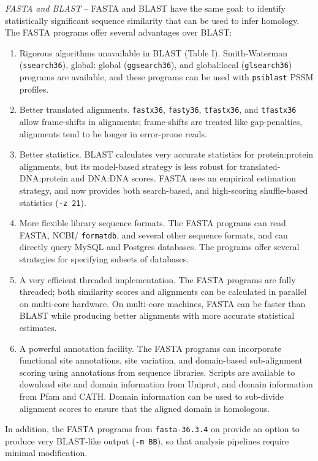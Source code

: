 \documentclass[11pt]{article}
\begin{document}
\emph{FASTA and BLAST} -- FASTA and BLAST have the same goal: to
identify statistically significant sequence similarity that can be
used to infer homology.  The FASTA programs offer several advantages
over BLAST:
\begin{enumerate}
\item
Rigorous algorithms unavailable in BLAST (Table I).  Smith-Waterman
(\texttt{ssearch36}), global: global (\texttt{ggsearch36}), and
global:local (\texttt{glsearch36}) programs are available, and these
programs can be used with \texttt{psiblast} PSSM profiles.
\item
Better translated alignments. \texttt{fastx36}, \texttt{fasty36},
\texttt{tfastx36}, and \texttt{tfastx36} allow frame-shifts in
alignments; frame-shifts are treated like gap-penalties, alignments
tend to be longer in error-prone reads.
\item
Better statistics. BLAST calculates very accurate statistics for
protein:protein alignments, but its model-based strategy is less
robust for translated-DNA:protein and DNA:DNA scores.  FASTA uses an
empirical estimation strategy, and now provides both search-based, and
high-scoring shuffle-based statistics (\texttt{-z 21}).
\item
More flexible library sequence formats.  The FASTA programs can read
FASTA, NCBI/ \texttt{formatdb}, and several other sequence formats, and can
directly query MySQL and Postgres databases. The programs offer
several strategies for specifying subsets of databases.
\item
A very efficient threaded implementation.  The FASTA programs are
fully threaded; both similarity scores and alignments can be
calculated in parallel on multi-core hardware.  On multi-core
machines, FASTA can be faster than BLAST while producing better
alignments with more accurate statistical estimates.
\item
  A powerful annotation facility.  The FASTA programs can incorporate
  functional site annotations, site variation, and domain-based
  sub-alignment scoring using annotations from sequence libraries.
  Scripts are available to download site and domain information from
  Uniprot, and domain information from Pfam and CATH.  Domain
  information can be used to sub-divide alignment scores to ensure
  that the aligned domain is homologous.

\end{enumerate}

In addition, the FASTA programs from \texttt{fasta-36.3.4} on provide
an option to produce very BLAST-like output (\texttt{-m BB}), so that
analysis pipelines require minimal modification.
\end{document}
